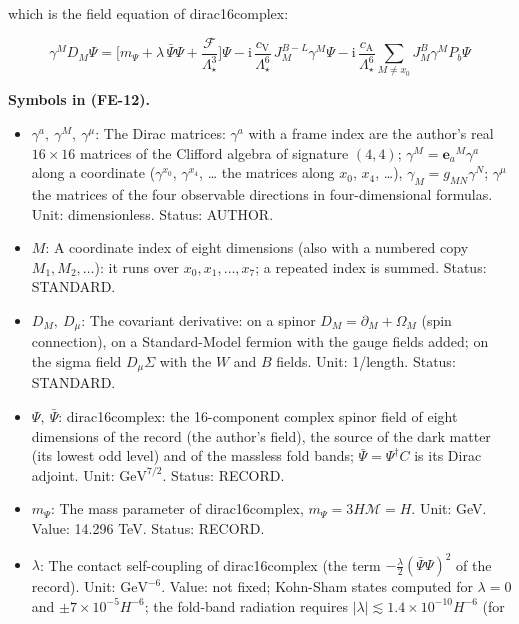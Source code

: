 \documentclass[
  10pt,
]{article}
\providecommand{\tightlist}{%
  \setlength{\itemsep}{0pt}\setlength{\parskip}{0pt}}
\begin{document}
which is the field equation of dirac16complex:

\[
\gamma^MD_M\Psi = \Big[m_\Psi + \lambda\,\bar\Psi\Psi + \frac{\mathcal{F}}{\Lambda_\star^3}\Big]\Psi
 - \mathrm{i}\,\frac{c_{\mathrm{V}}}{\Lambda_\star^6}\,J^{B-L}_M\gamma^M\Psi
 - \mathrm{i}\,\frac{c_{\mathrm{A}}}{\Lambda_\star^6}\sum_{M\ne x_0}J^{B}_M\gamma^MP_b\Psi \tag{FE-12}
\]

\textbf{Symbols in (FE-12).}

\begin{itemize}
\tightlist
\item
  \(\gamma^a,\ \gamma^M,\ \gamma^\mu\): The Dirac matrices: \(\gamma^a\)
  with a frame index are the author's real \(16 \times 16\) matrices of
  the Clifford algebra of signature \((4, 4)\);
  \(\gamma^M = \mathbf{e}_a{}^M\gamma^a\) along a coordinate
  (\(\gamma^{x_0}\), \(\gamma^{x_4}\), \ldots{} the matrices along
  \(x_0\), \(x_4\), \ldots), \(\gamma_M = g_{MN}\gamma^N\);
  \(\gamma^\mu\) the matrices of the four observable directions in
  four-dimensional formulas. Unit: dimensionless. Status: AUTHOR.
\item
  \(M\): A coordinate index of eight dimensions (also with a numbered
  copy \(M_1, M_2, \dots\)): it runs over \(x_0, x_1, \dots, x_7\); a
  repeated index is summed. Status: STANDARD.
\item
  \(D_M,\ D_\mu\): The covariant derivative: on a spinor
  \(D_M = \partial_M + \Omega_M\) (spin connection), on a Standard-Model
  fermion with the gauge fields added; on the sigma field
  \(D_\mu\Sigma\) with the \(W\) and \(B\) fields. Unit: 1/length.
  Status: STANDARD.
\item
  \(\Psi,\ \bar\Psi\): dirac16complex: the 16-component complex spinor
  field of eight dimensions of the record (the author's field), the
  source of the dark matter (its lowest odd level) and of the massless
  fold bands; \(\bar\Psi = \Psi^\dagger C\) is its Dirac adjoint. Unit:
  \(\mathrm{GeV}^{7/2}\). Status: RECORD.
\item
  \(m_\Psi\): The mass parameter of dirac16complex,
  \(m_\Psi = 3H\mathcal{M} = H\). Unit: GeV. Value: 14.296 TeV. Status:
  RECORD.
\item
  \(\lambda\): The contact self-coupling of dirac16complex (the term
  \(-\frac{\lambda}{2}(\bar\Psi\Psi)^2\) of the record). Unit:
  \(\mathrm{GeV}^{-6}\). Value: not fixed; Kohn-Sham states computed for
  \(\lambda = 0\) and \(\pm7\times10^{-5}H^{-6}\); the fold-band
  radiation requires
  \(\lvert\lambda\rvert \lesssim 1.4\times10^{-10}H^{-6}\) (for

\end{itemize}
\end{document}
